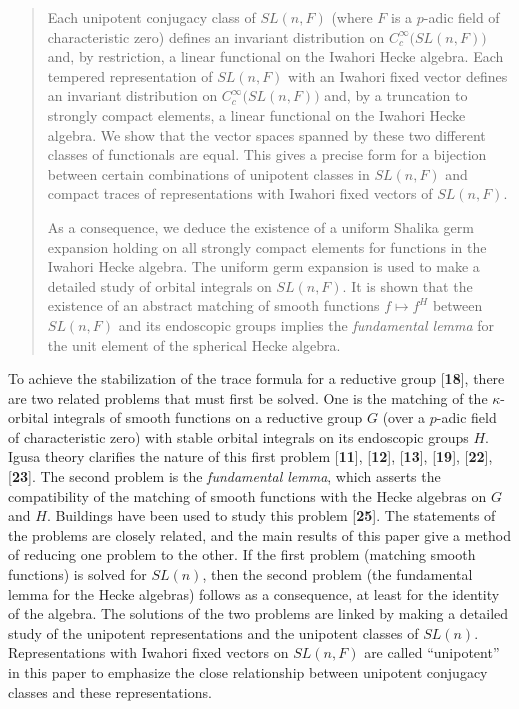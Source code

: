 \documentclass{amsart}
\begin{document}
\begin{abstract}
Each unipotent conjugacy class of $ SL(n,F)$ (where $F$ is a $p$-adic
  field of characteristic zero) defines an invariant distribution on $
  C_c^{\infty} \bigl( SL(n,F) \bigr) $ and, by restriction, a linear
  functional on the Iwahori Hecke algebra.  Each tempered
  representation of $ SL(n,F) $ with an Iwahori fixed vector defines
  an invariant distribution on $ C_c^{\infty} \bigl( SL(n,F) \bigr) $
  and, by a truncation to strongly compact elements, a linear
  functional on the Iwahori Hecke algebra.  We show that the vector
  spaces spanned by these two different classes of functionals are
  equal.  This gives a precise form for a bijection between certain
  combinations of unipotent classes in $ SL(n,F) $ and compact traces
  of representations with Iwahori fixed vectors of $ SL(n,F) $.

As a consequence, we deduce the existence of a uniform Shalika germ
  expansion holding on all strongly compact elements for functions in
  the Iwahori Hecke algebra.  The uniform germ expansion is used to
  make a detailed study of orbital integrals on $ SL(n,F) $.  It is
  shown that the existence of an abstract matching of smooth functions
  $ f \mapsto f^H $ between $ SL(n,F) $ and its endoscopic groups
  implies the {\it fundamental lemma} for the unit element of the
  spherical Hecke algebra.
\end{abstract}

\maketitle

To achieve the stabilization of the trace formula for
  a reductive group [{\bf 18}], there are two related  
  problems that must first be solved.
One is the matching of the
    $ \kappa $-orbital 
  integrals of smooth functions on a reductive group $G$ (over a 
    $p$-adic field of characteristic zero)
  with stable orbital integrals on its endoscopic
  groups $H$.
  Igusa theory clarifies the nature of this first problem
  [{\bf 11}], [{\bf 12}], [{\bf 13}],  [{\bf 19}],
  [{\bf 22}], [{\bf 23}].
The second problem is the {\it fundamental lemma}, which 
  asserts the compatibility of the matching of smooth functions
  with the Hecke algebras on $G$ and $H$.  
  Buildings have been used to study this problem
  [{\bf 25}].
The statements of the problems are closely related,
and the main results of this paper give a method
of reducing one problem to the other.
 If the first problem (matching smooth functions)
  is solved for $SL(n)$, then the second problem (the fundamental lemma
  for the Hecke algebras) follows as a consequence,
  at least for the identity of the algebra.
The solutions of the two problems are linked by making
  a detailed study of the unipotent representations and 
  the unipotent classes of 
    $SL(n)$.
  Representations with Iwahori fixed vectors on
  $SL(n,F)$ are called ``unipotent'' in this paper to emphasize
  the close relationship between unipotent conjugacy classes and
  these representations.
\end{document}
